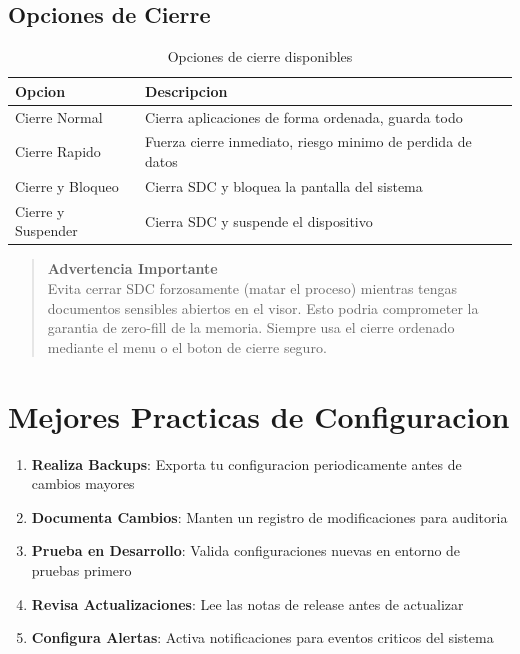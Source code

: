 \subsection{Opciones de Cierre}

\begin{table}[H]
\centering
\begin{tabular}{p{4cm}p{8.5cm}}
\toprule
\textbf{Opcion} & \textbf{Descripcion} \\
\midrule
Cierre Normal & Cierra aplicaciones de forma ordenada, guarda todo \\
\midrule
Cierre Rapido & Fuerza cierre inmediato, riesgo minimo de perdida de datos \\
\midrule
Cierre y Bloqueo & Cierra SDC y bloquea la pantalla del sistema \\
\midrule
Cierre y Suspender & Cierra SDC y suspende el dispositivo \\
\bottomrule
\end{tabular}
\caption{Opciones de cierre disponibles}
\label{tab:opciones-cierre}
\end{table}

\begin{quote}
\textbf{Advertencia Importante}\\
Evita cerrar SDC forzosamente (matar el proceso) mientras tengas documentos sensibles abiertos en el visor. Esto podria comprometer la garantia de zero-fill de la memoria. Siempre usa el cierre ordenado mediante el menu o el boton de cierre seguro.
\end{quote}

\section{Mejores Practicas de Configuracion}

\begin{enumerate}[leftmargin=*]
    \item \textbf{Realiza Backups}: Exporta tu configuracion periodicamente antes de cambios mayores
    \item \textbf{Documenta Cambios}: Manten un registro de modificaciones para auditoria
    \item \textbf{Prueba en Desarrollo}: Valida configuraciones nuevas en entorno de pruebas primero
    \item \textbf{Revisa Actualizaciones}: Lee las notas de release antes de actualizar
    \item \textbf{Configura Alertas}: Activa notificaciones para eventos criticos del sistema
\end{enumerate}

